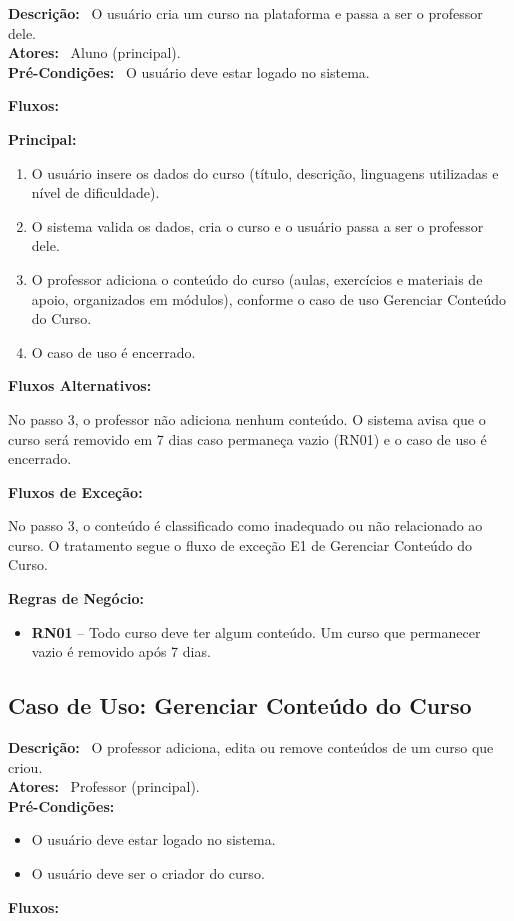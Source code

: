 \documentclass[11pt,a4paper]{article}
\newcommand{\casodeuso}[1]{\subsection{Caso de Uso: #1}}
\newcommand{\campo}[1]{\textbf{#1:}~}
\newcommand{\fluxotitulo}[1]{\par\needspace{8\baselineskip}\medskip\hspace*{1.5em}\textbf{#1}\par\nopagebreak}
\newenvironment{principal}
  {\begin{enumerate}[leftmargin=4.5em,itemsep=0pt,topsep=2pt]}
  {\end{enumerate}}
\newenvironment{passos}
  {\begin{description}[leftmargin=4.5em,labelindent=3em,itemsep=0pt,topsep=2pt,
     font=\normalfont\bfseries,style=sameline]}
  {\end{description}}
\newcommand{\passo}[1]{\item[#1 -]}
\newenvironment{itens}
  {\begin{itemize}[leftmargin=3em,itemsep=0pt,topsep=2pt]}
  {\end{itemize}}
\begin{document}
  \campo{Descrição} O usuário cria um curso na plataforma e passa a ser o
  professor dele.\\
  \campo{Atores} Aluno (principal).\\
  \campo{Pré-Condições} O usuário deve estar logado no sistema.

  \campo{Fluxos}

  \fluxotitulo{Principal:}
  \begin{principal}
    \item O usuário insere os dados do curso (título, descrição, linguagens
    utilizadas e nível de dificuldade).
    \item O sistema valida os dados, cria o curso e o usuário passa a ser o
    professor dele.
    \item O professor adiciona o conteúdo do curso (aulas, exercícios e
    materiais de apoio, organizados em módulos), conforme o caso de uso
    Gerenciar Conteúdo do Curso.
    \item O caso de uso é encerrado.
  \end{principal}

  \fluxotitulo{Fluxos Alternativos:}
  \begin{passos}
    \passo{A1} No passo 3, o professor não adiciona nenhum conteúdo. O sistema
    avisa que o curso será removido em 7 dias caso permaneça vazio (RN01) e o
    caso de uso é encerrado.
  \end{passos}

  \fluxotitulo{Fluxos de Exceção:}
  \begin{passos}
    \passo{E1} No passo 3, o conteúdo é classificado como inadequado ou não
    relacionado ao curso. O tratamento segue o fluxo de exceção E1 de Gerenciar
    Conteúdo do Curso.
  \end{passos}

  \campo{Regras de Negócio}
  \begin{itens}
    \item \textbf{RN01} -- Todo curso deve ter algum conteúdo. Um curso que
    permanecer vazio é removido após 7 dias.
  \end{itens}

  \casodeuso{Gerenciar Conteúdo do Curso}

  \campo{Descrição} O professor adiciona, edita ou remove conteúdos de um curso
  que criou.\\
  \campo{Atores} Professor (principal).\\
  \campo{Pré-Condições}
  \begin{itens}
    \item O usuário deve estar logado no sistema.
    \item O usuário deve ser o criador do curso.
  \end{itens}
  \campo{Fluxos}
\end{document}
